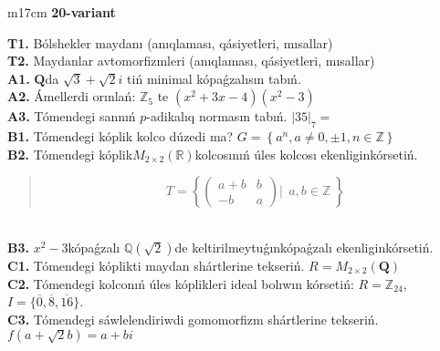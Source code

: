 \documentclass{article}
\begin{document}
\begin{tabular}{m{17cm}}
\textbf{20-variant}
\newline

\textbf{T1.} Bólshekler maydanı (anıqlaması, qásiyetleri, mısallar) \\
\textbf{T2.} Maydanlar avtomorfizmleri (anıqlaması, qásiyetleri, mısallar) \\
\textbf{A1.} \(\mathbf{Q}\)da \(\sqrt{3} + \sqrt{2}i\) tiń minimal kópaǵzalısın tabıń. \\
\textbf{A2.} Ámellerdi orınlań: \(\mathbb{Z}_{5}\) te \(\left( x^{2} + 3x - 4 \right)\left( x^{2} - 3 \right)\) \\
\textbf{A3.} Tómendegi sannıń \(p\)-adikalıq normasın tabıń. \(|35|_{7} =\) \\
\textbf{B1.} Tómendegi kóplik kolco dúzedi ma? \(G = \left\{ a^{n},a \neq 0, \pm 1,n \in \mathbb{Z} \right\}\) \\
\textbf{B2.} Tómendegi kóplik\(M_{2 \times 2}\left( \mathbb{R} \right)\)kolcosınıń úles kolcosı ekenliginkórsetiń.
\begin{quote}
\[T = \left\{ \begin{pmatrix}
a + b & b \\
 - b & a
\end{pmatrix}\left| \ \ a,b\mathbb{\in Z} \right.\  \right\}\]
\end{quote} \\
\textbf{B3.} \(x^{2} - 3\)kópaǵzalı \(\mathbb{Q}(\sqrt{2})\)de keltirilmeytuǵınkópaǵzalı ekenliginkórsetiń. \\
\textbf{C1.} Tómendegi kóplikti maydan shártlerine tekseriń. \(R = M_{2 \times 2}\left( \mathbf{Q} \right)\) \\
\textbf{C2.} Tómendegi kolconıń úles kóplikleri ideal bolıwın kórsetiń:
\(R = \mathbb{Z}_{24}\), \(I = \{\overline{0},\overline{8},\overline{16}\}\). \\
\textbf{C3.} Tómendegi sáwlelendiriwdi gomomorfizm shártlerine tekseriń. \(f\left( a + \sqrt{2}b \right) = a + bi\) \\

\end{tabular}
\vspace{1cm}
\end{document}
